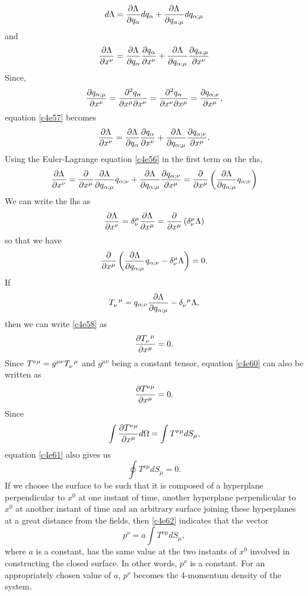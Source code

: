 \begin{enumerate}
\[
d\Lambda = \frac{\partial{\Lambda}}{\partial{q_\alpha}}dq_\alpha + \frac{\partial{\Lambda}}{\partial{q_{\alpha;\mu}}}dq_{\alpha;\mu}
\]
and
\begin{equation}\label{c4e57}
\frac{\partial{\Lambda}}{\partial{x^\nu}} = \frac{\partial{\Lambda}}{\partial{q_\alpha}}\frac{\partial{q_\alpha}}{\partial{x^\nu}} + 
\frac{\partial{\Lambda}}{\partial{q_{\alpha;\mu}}}\frac{\partial{q_{\alpha;\mu}}}{\partial{x^\nu}}
\end{equation}
Since,
\[
\frac{\partial{q_{\alpha;\mu}}}{\partial{x^\nu}} = \frac{\partial^2 q_\alpha}{\partial x^\mu \partial x^\nu}
= \frac{\partial^2 q_\alpha}{\partial x^\nu \partial x^\mu} =\frac{\partial{q_{\alpha;\nu}}}{\partial{x^\mu}},
\]
equation \eqref{c4e57} becomes
\[
\frac{\partial{\Lambda}}{\partial{x^\nu}} = \frac{\partial{\Lambda}}{\partial{q_\alpha}}\frac{\partial{q_\alpha}}{\partial{x^\nu}} + 
\frac{\partial{\Lambda}}{\partial{q_{\alpha;\mu}}}\frac{\partial{q_{\alpha;\nu}}}{\partial{x^\mu}}.
\]
Using the Euler-Lagrange equation \eqref{c4e56} in the first term on the rhs,
\[
\frac{\partial{\Lambda}}{\partial{x^\nu}} = \frac{\partial}{\partial x^\mu}\frac{\partial{\Lambda}}{\partial{q_{\alpha;\mu}}}
q_{\alpha;\nu} + \frac{\partial{\Lambda}}{\partial{q_{\alpha;\mu}}}\frac{\partial{q_{\alpha;\nu}}}{\partial{x^\mu}} =
\frac{\partial}{\partial x^\mu}\left(\frac{\partial{\Lambda}}{\partial{q_{\alpha;\mu}}}q_{\alpha;\nu}\right)
\]
We can write the lhs as
\[
\frac{\partial{\Lambda}}{\partial{x^\nu}} = \delta^\mu_\nu\frac{\partial{\Lambda}}{\partial{x^\mu}} = 
\frac{\partial}{\partial x^\mu}\left(\delta^\mu_\nu \Lambda\right)
\]
so that we have
\begin{equation}\label{c4e58}
\frac{\partial}{\partial x^\mu}
\left(\frac{\partial{\Lambda}}{\partial{q_{\alpha;\mu}}}q_{\alpha;\nu} - \delta^\mu_\nu \Lambda\right) = 0.
\end{equation}
If
\begin{equation}\label{c4e59}
\tensor{T}{_\nu^\mu} = q_{\alpha;\nu}\pdt{\Lambda}{q_{\alpha;\mu}} - 
\tensor{\delta}{_\nu^\mu} \Lambda,
\end{equation}
then we can write \eqref{c4e58} as
\begin{equation}\label{c4e60}
\pdt{\tensor{T}{_\nu^\mu}}{x^\mu} = 0.
\end{equation}
Since $T^{\nu\mu} = g^{\mu\nu}\tensor{T}{_\nu^\mu}$ and $g^{\mu\nu}$ being a constant tensor,
equation \eqref{c4e60} can also be written as
\begin{equation}\label{c4e61}
\frac{\partial{T^{\nu\mu}}}{\partial{x^\mu}} = 0.
\end{equation}
Since
\[
\int \frac{\partial{T^{\nu\mu}}}{\partial{x^\mu}} d\Omega = \int T^{\nu\mu} dS_\mu,
\]
equation \eqref{c4e61} also gives us
\begin{equation}\label{c4e62}
\oint T^{\nu\mu} dS_\mu = 0.
\end{equation}
If we choose the surface to be such that it is composed of a hyperplane 
perpendicular to $x^0$ at one instant of time, another hyperplane 
perpendicular to $x^0$ at another instant of time and an arbitrary surface
joining these hyperplanes at a great distance from the fields, then \eqref{c4e62}
indicates that the vector
\begin{equation}\label{c4e63}
p^\nu = a\int T^{\nu\mu}dS_\mu,
\end{equation}
where $a$ is a constant, has the same value at the two instants of $x^0$ involved
in constructing the closed surface. In other words, $p^\nu$ is a constant. For an
appropriately chosen value of $a$, $p^\nu$ becomes the 4-momentum density of the
system.


\end{enumerate}
